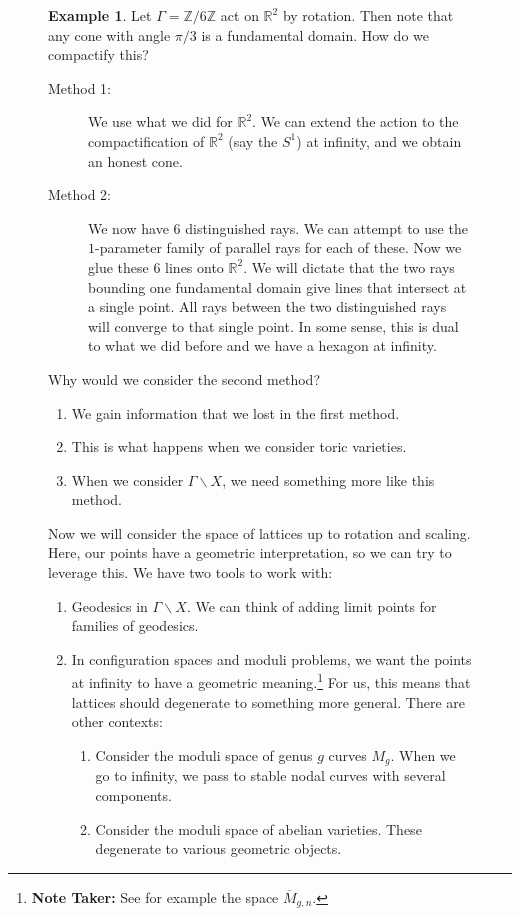 \documentclass[leqno, openany]{memoir}
\theoremstyle{definition}
\newtheorem{exm}[thm]{Example}
\theoremstyle{remark}
\theoremstyle{plain}
\theoremstyle{definition}
\theoremstyle{remark}
\newcommand{\R}{\mathbb{R}}
\newcommand{\Z}{\mathbb{Z}}
\begin{document}
\begin{figure}[H]
\begin{exm} Let $\Gamma = \Z/6\Z$ act on $\R^2$ by rotation. Then note that any
    cone with angle $\pi/3$ is a fundamental domain. How do we compactify this?
    \begin{description} \item[Method 1:] We use what we did for $\R^2$. We can
        extend the action to the compactification of $\R^2$ (say the $S^1$) at
        infinity, and we obtain an honest cone.  \item[Method 2:] We now have
        $6$ distinguished rays. We can attempt to use the $1$-parameter family
        of parallel rays for each of these. Now we glue these $6$ lines onto
        $\R^2$. We will dictate that the two rays bounding one fundamental
        domain give lines that intersect at a single point. All rays between
        the two distinguished rays will converge to that single point. In some
        sense, this is dual to what we did before and we have a hexagon at
        infinity.  \end{description}

    Why would we consider the second method?  \begin{enumerate} \item We gain
        information that we lost in the first method.  \item This is what
        happens when we consider toric varieties.  \item When we consider
        $\Gamma \backslash X$, we need something more like this method.
\end{enumerate} \end{exm}

Now we will consider the space of lattices up to rotation and scaling. Here,
our points have a geometric interpretation, so we can try to leverage this. We
have two tools to work with: \begin{enumerate} \item Geodesics in $\Gamma
    \backslash X$. We can think of adding limit points for families of
    geodesics.  \item In configuration spaces and moduli problems, we want the
    points at infinity to have a geometric meaning.\footnote{\textbf{Note
    Taker:} See for example the space $\overline{M}_{g,n}$.} For us, this means
    that lattices should degenerate to something more general. There are other
    contexts: \begin{enumerate} \item Consider the moduli space of genus $g$
        curves $M_g$. When we go to infinity, we pass to stable nodal curves
        with several components.  \item Consider the moduli space of abelian
        varieties. These degenerate to various geometric objects.
\end{enumerate} \end{enumerate}


\end{figure}
\end{document}
